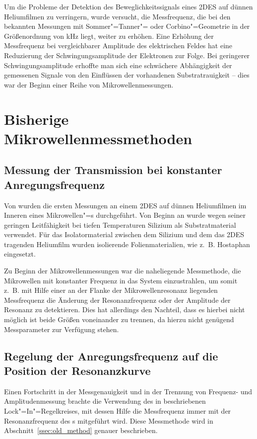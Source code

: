 Um die Probleme der Detektion des Beweglichkeitssignals eines 2DES auf dünnen Heliumfilmen zu verringern, wurde versucht, die Messfrequenz, die bei den bekannten Messungen mit Sommer"=Tanner"= oder Corbino"=Geometrie in der Größenordnung von \unit[100]{kHz} liegt, weiter zu erhöhen. Eine Erhöhung der Messfrequenz bei vergleichbarer Amplitude des elektrischen Feldes hat eine Reduzierung der Schwingungsamplitude der Elektronen zur Folge. Bei geringerer Schwingungsamplitude erhoffte man sich eine schwächere Abhängigkeit der gemessenen Signale von den Einflüssen der vorhandenen Substratrauigkeit -- dies war der Beginn einer Reihe von Mikrowellenmessungen.

\section{Bisherige Mikrowellenmessmethoden}
\subsection{Messung der Transmission bei konstanter Anregungsfrequenz}
Von  \cite{lehndorff} wurden die ersten Messungen an einem 2DES auf dünnen Heliumfilmen im Inneren eines Mikrowellen"=\HR s durchgeführt. Von Beginn an wurde wegen seiner geringen Leitfähigkeit bei tiefen Temperaturen Silizium als Substratmaterial verwendet. Für das Isolatormaterial zwischen dem Silizium und dem das 2DES tragenden Heliumfilm wurden isolierende Folienmaterialien, wie z.\ B. Hostaphan eingesetzt.

Zu Beginn der Mikrowellenmessungen war die naheliegende Messmethode, die Mikrowellen mit konstanter Frequenz in das System einzustrahlen, um somit z.~B. mit Hilfe einer an der Flanke der Mikrowellenresonanz liegenden Messfrequenz die Änderung der Resonanzfrequenz oder der Amplitude der Resonanz zu detektieren. Dies hat allerdings den Nachteil, dass es hierbei nicht möglich ist beide Größen voneinander zu trennen, da hierzu nicht genügend Messparameter zur Verfügung stehen.

\subsection{Regelung der Anregungsfrequenz auf die Position der Resonanzkurve}
Einen Fortschritt in der Messgenauigkeit und in der Trennung von Frequenz- und Amplitudenmessung brachte die Verwendung des in \cite{neser,guenzler} beschriebenen Lock"=In"=Regelkreises, mit dessen Hilfe die Messfrequenz immer mit der Resonanzfrequenz des \HR s mitgeführt wird. Diese Messmethode wird in Abschnitt~\ref{ssec:old_method} genauer beschrieben. 

